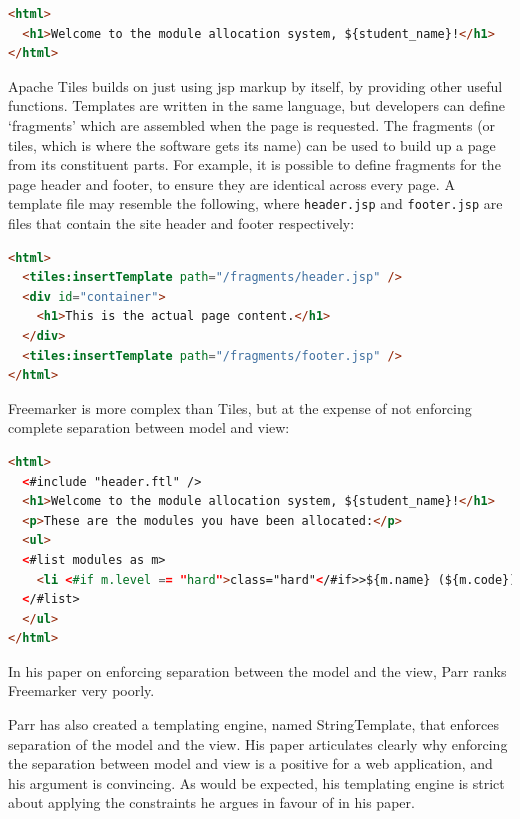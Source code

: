 \documentclass[draft]{scrartcl}
\begin{document}
\begin{lstlisting}[language=HTML]
<html>
  <h1>Welcome to the module allocation system, ${student_name}!</h1>
</html>
\end{lstlisting}


Apache Tiles builds on just using \gls{jsp} markup by itself, by providing
other useful functions. Templates are written in the same language, but
developers can define `fragments' which are assembled when the page is
requested. The fragments (or tiles, which is where the software gets its name)
can be used to build up a page from its constituent parts. For example, it is
possible to define fragments for the page header and footer, to ensure they
are identical across every page. A template file may resemble the following,
where \texttt{header.jsp} and \texttt{footer.jsp} are files that contain the
site header and footer respectively:

\begin{lstlisting}[language=HTML]
<html>
  <tiles:insertTemplate path="/fragments/header.jsp" />
  <div id="container">
    <h1>This is the actual page content.</h1>
  </div>
  <tiles:insertTemplate path="/fragments/footer.jsp" />
</html>
\end{lstlisting}


Freemarker is more complex than Tiles, but at the expense of not enforcing
complete separation between model and view:

\begin{lstlisting}[language=HTML]
<html>
  <#include "header.ftl" />
  <h1>Welcome to the module allocation system, ${student_name}!</h1>
  <p>These are the modules you have been allocated:</p>
  <ul>
  <#list modules as m>
    <li <#if m.level == "hard">class="hard"</#if>>${m.name} (${m.code})</li>
  </#list>
  </ul>
</html>
\end{lstlisting}

In his paper on enforcing separation between the model and the view, Parr
\cite{Parr2004templateengines} ranks Freemarker very poorly.


Parr has also created a templating engine, named StringTemplate, that enforces
separation of the model and the view. His paper articulates clearly why
enforcing the separation between model and view is a positive for a web
application, and his argument is convincing. As would be expected, his
templating engine is strict about applying the constraints he argues in favour
of in his paper.
\end{document}
